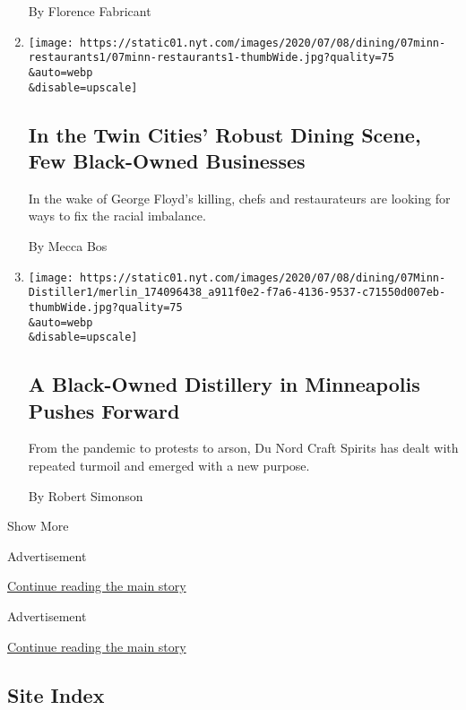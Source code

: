 \begin{enumerate}
  By Florence Fabricant
\item
  \href{/2020/07/07/dining/twin-cities-restaurants-racial-injustice.html}{}

  \texttt{[image: https://static01.nyt.com/images/2020/07/08/dining/07minn-restaurants1/07minn-restaurants1-thumbWide.jpg?quality=75\\\&auto=webp\\\&disable=upscale]}

  \hypertarget{in-the-twin-cities-robust-dining-scene-few-black-owned-businesses}{%
  \subsection{In the Twin Cities' Robust Dining Scene, Few Black-Owned
  Businesses}\label{in-the-twin-cities-robust-dining-scene-few-black-owned-businesses}}

  In the wake of George Floyd's killing, chefs and restaurateurs are
  looking for ways to fix the racial imbalance.

  By Mecca Bos
\item
  \href{/2020/07/07/dining/drinks/du-nord-black-owned-distillery-minneapolis.html}{}

  \texttt{[image: https://static01.nyt.com/images/2020/07/08/dining/07Minn-Distiller1/merlin\_174096438\_a911f0e2-f7a6-4136-9537-c71550d007eb-thumbWide.jpg?quality=75\\\&auto=webp\\\&disable=upscale]}

  \hypertarget{a-black-owned-distillery-in-minneapolis-pushes-forward}{%
  \subsection{A Black-Owned Distillery in Minneapolis Pushes
  Forward}\label{a-black-owned-distillery-in-minneapolis-pushes-forward}}

  From the pandemic to protests to arson, Du Nord Craft Spirits has
  dealt with repeated turmoil and emerged with a new purpose.

  By Robert Simonson
\end{enumerate}

Show More

Advertisement

\protect\hyperlink{after-mid1}{Continue reading the main story}

Advertisement

\protect\hyperlink{after-mktg}{Continue reading the main story}

\hypertarget{site-index}{%
\subsection{Site Index}\label{site-index}}

